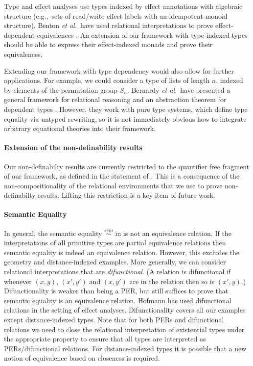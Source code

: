 Type and effect analyses use types indexed by effect annotations with
algebraic structure (e.g.,~sets of read/write effect labels with an
idempotent monoid structure). Benton {\em et al.}~have used relational
interpretations to prove effect-dependent equivalences
\cite{benton06reading}. An extension of our framework with
type-indexed types should be able to express their effect-indexed monads
and prove their equivalences.

Extending our framework with type dependency would also allow for
further applications. For example, we could consider a type of lists
of length $n$, indexed by elements of the permutation group
$S_n$. Bernardy {\em et al.}~have presented a general framework for
relational reasoning and an abstraction theorem for dependent types
\cite{bernardy12proofs}. However, they work with pure type systems,
which define type equality via untyped rewriting, so it is not
immediately obvious how to integrate arbitrary equational theories
into their framework.

\paragraph{Extension of the non-definability results} Our
non-definabilty results are currently restricted to the quantifier
free fragment of our framework, as defined in the statement of
. This is a consequence of the
non-compositionality of the relational environments that we use to
prove non-definabilty results. Lifting this restriction is a key item
of future work.

\paragraph{Semantic Equality} In general, the semantic equality
$\stackrel{sem}\sim$ in  is not an
equivalence relation. If the interpretations of all 
primitive types are partial equivalence relations then semantic
equality is indeed an equivalence relation. However, this excludes the
geometry and distance-indexed examples. More generally, we can
consider relational interpretations that are \emph{difunctional}. (A
relation is difunctional if whenever $(x,y)$, $(x',y')$ and $(x,y')$
are in the relation then so is $(x',y)$.) Difunctionality is weaker
than being a PER, but still suffices to prove that semantic equality
is an equivalence relation. Hofmann \cite{hofmann08correctness} has
used difunctional relations in the setting of effect
analyses. Difunctionality covers all our examples except
distance-indexed types. Note that for both PERs and difunctional
relations we need to close the relational interpretation of
existential types under the appropriate property to ensure that all
types are interpreted as PERs/difunctional relations. For
distance-indexed types it is possible that a new notion of
equivalence based on closeness is required.

